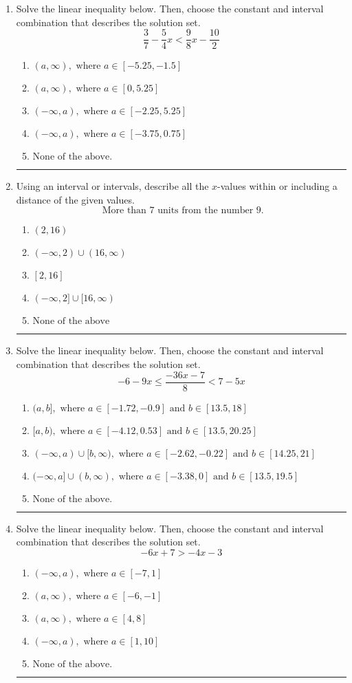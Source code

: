\documentclass[14pt]{extbook}
\newcommand{\litem}[1]{\item#1\hspace*{-1cm}\rule{\textwidth}{0.4pt}}
\begin{document}
\begin{enumerate}
{\begin{enumerate}[label=\Alph*.]
\end{enumerate} }
\litem{
Solve the linear inequality below. Then, choose the constant and interval combination that describes the solution set.\[ \frac{3}{7} - \frac{5}{4} x < \frac{9}{8} x - \frac{10}{2} \]\begin{enumerate}[label=\Alph*.]
\item \( (a, \infty), \text{ where } a \in [-5.25, -1.5] \)
\item \( (a, \infty), \text{ where } a \in [0, 5.25] \)
\item \( (-\infty, a), \text{ where } a \in [-2.25, 5.25] \)
\item \( (-\infty, a), \text{ where } a \in [-3.75, 0.75] \)
\item \( \text{None of the above}. \)

\end{enumerate} }
\litem{
Using an interval or intervals, describe all the $x$-values within or including a distance of the given values.\[ \text{ More than } 7 \text{ units from the number } 9. \]\begin{enumerate}[label=\Alph*.]
\item \( (2, 16) \)
\item \( (-\infty, 2) \cup (16, \infty) \)
\item \( [2, 16] \)
\item \( (-\infty, 2] \cup [16, \infty) \)
\item \( \text{None of the above} \)

\end{enumerate} }
\litem{
Solve the linear inequality below. Then, choose the constant and interval combination that describes the solution set.\[ -6 - 9 x \leq \frac{-36 x - 7}{8} < 7 - 5 x \]\begin{enumerate}[label=\Alph*.]
\item \( (a, b], \text{ where } a \in [-1.72, -0.9] \text{ and } b \in [13.5, 18] \)
\item \( [a, b), \text{ where } a \in [-4.12, 0.53] \text{ and } b \in [13.5, 20.25] \)
\item \( (-\infty, a) \cup [b, \infty), \text{ where } a \in [-2.62, -0.22] \text{ and } b \in [14.25, 21] \)
\item \( (-\infty, a] \cup (b, \infty), \text{ where } a \in [-3.38, 0] \text{ and } b \in [13.5, 19.5] \)
\item \( \text{None of the above.} \)

\end{enumerate} }
\litem{
Solve the linear inequality below. Then, choose the constant and interval combination that describes the solution set.\[ -6x + 7 > -4x -3 \]\begin{enumerate}[label=\Alph*.]
\item \( (-\infty, a), \text{ where } a \in [-7, 1] \)
\item \( (a, \infty), \text{ where } a \in [-6, -1] \)
\item \( (a, \infty), \text{ where } a \in [4, 8] \)
\item \( (-\infty, a), \text{ where } a \in [1, 10] \)
\item \( \text{None of the above}. \)


\end{enumerate}}
\end{enumerate}
\end{document}
